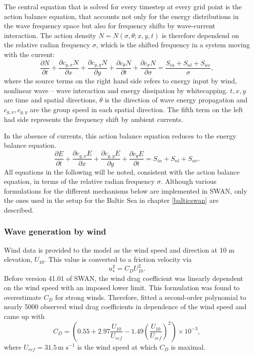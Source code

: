 The central equation that is solved for every timestep at every grid point is the action balance equation, that accounts not only for the energy distributions in the wave frequency space but also for frequency shifts by wave-current interaction. The action density $N=N(\sigma,\theta; x,y,t)$ is therefore dependend on the relative radian frequency $\sigma$, which is the shifted frequency in a system moving with the current:
\begin{equation}\label{ebe}
 \frac{\partial N}{\partial t} + \frac{\partial c_{g,x} N}{\partial x} + \frac{ \partial c_{g,y} N}{\partial y} + \frac{\partial c_{\theta} N}{\partial t} + \frac{\partial c_{\sigma} N}{\partial \sigma}= \frac{S_{in} + S_{nl} + S_{wc}}{\sigma},
\end{equation}
where the source terms on the right hand side refers to energy input by wind, nonlinear wave -- wave interaction and energy dissipation by whitecapping. $t, x ,y$ are time and spatial directions, $\theta$ is the direction of wave energy propagation and $c_{g,x}, c_{g,y}$ are the group speed in each spatial direction. The fifth term on the left had side represents the frequency shift by ambient currents.

In the absence of currents, this action balance equation reduces to the energy balance equation.
\begin{equation}\label{ebe}
 \frac{\partial E}{\partial t} + \frac{\partial c_{g,x} E}{\partial x} + \frac{ \partial c_{g,y} E}{\partial y} + \frac{\partial c_{\theta} E}{\partial t} = S_{in} + S_{nl} + S_{wc}.
\end{equation}
All equations in the following will be noted, consistent with the action balance equation, in terms of the relative radian frequency $\sigma$. Although various formulations for the different mechanisms below are implemented in SWAN, only the ones used in the setup for the Baltic Sea in chapter \ref{balticswan} are described.

\subsubsection{Wave generation by wind}

Wind data is provided to the model as the wind speed and direction at 10 m elevation, $U_{10}$. This value is converted to a friction velocity via
\begin{equation}
 u_\ast^2 = C_D U_{10}^2.
\end{equation}
Before version 41.01 of SWAN, the wind drag coefficient was linearly dependent on the wind speed with an imposed lower limit. This formulation was found to overestimate $C_D$ for strong winds. Therefore, \cite{zijlema2012} fitted a second-order polynomial to nearly 5000 observed wind drag coefficients in dependence of the wind speed and came up with 
\begin{equation}
 C_D = \left( 0.55 + 2.97 \dfrac{U_{10}}{U_{ref}} - 1.49 \left( \dfrac{U_{10}}{U_{ref}} \right)^2 \right) \times 10^{-3} ,
\end{equation}
where $U_{ref} = 31.5 \, \text{m s}^{-1}$ is the wind speed at which $C_D$ is maximal.


